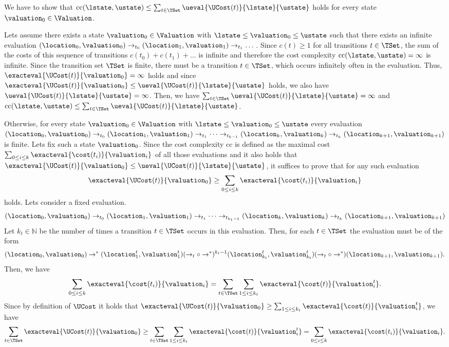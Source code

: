 We have to show that $\text{cc}(\lstate, \ustate) \leq \sum_{t \in \TSet} \ueval{\UCost(t)}{\lstate}{\ustate}$ holds for every state $\valuation_0 \in \Valuation$.

Lets assume there exists a state $\valuation_0 \in \Valuation$ with $\lstate \leq \valuation_0 \leq \ustate$ such that there exists an infinite evaluation $(\location_0, \valuation_0) \rightarrow_{t_0} (\location_1, \valuation_1) \rightarrow_{t_1} \dots$.
Since $c(t) \geq 1$ for all transitions $t \in \TSet$, the sum of the costs of this sequence of transitions $c(t_0) + c(t_1) + \dots$ is infinite and therefore the cost complexity $\text{cc}(\lstate, \ustate) = \infty$ is infinite.
Since the transition set $\TSet$ is finite, there must be a transition $t \in \TSet$, which occurs infinitely often in the evaluation.
Thus, $\exacteval{\UCost(t)}{\valuation_0} = \infty$ holds and since $\exacteval{\UCost(t)}{\valuation_0} \leq \ueval{\UCost(t)}{\lstate}{\ustate}$ holds, we also have $\ueval{\UCost(t)}{\lstate}{\ustate} = \infty$.
Then, we have $\sum_{t \in \TSet} \ueval{\UCost(t)}{\lstate}{\ustate} = \infty$ and $\text{cc}(\lstate, \ustate) \leq \sum_{t \in \TSet} \ueval{\UCost(t)}{\lstate}{\ustate}$.

Otherwise, for every state $\valuation_0 \in \Valuation$ with $\lstate \leq \valuation_0 \leq \ustate$ every evaluation $(\location_0, \valuation_0) \rightarrow_{t_0} (\location_1, \valuation_1) \rightarrow_{t_1} \dots \rightarrow_{t_{k-1}} (\location_k, \valuation_k) \rightarrow_{t_k} (\location_{k+1}, \valuation_{k+1})$ is finite.
Lets fix such a state $\valuation_0$.
Since the cost complexity $\text{cc}$ is defined as the maximal cost $\sum_{0 \leq i \leq k} \exacteval{\cost(t_i)}{\valuation_i}$ of all those evaluations and it also holds that $\exacteval{\UCost(t)}{\valuation_0} \leq \ueval{\UCost(t)}{\lstate}{\ustate}$, it suffices to prove that for any such evaluation \[ \exacteval{\UCost(t)}{\valuation_0} \geq \sum_{0 \leq i \leq k} \exacteval{\cost(t_i)}{\valuation_i} \] holds.
Lets consider a fixed evaluation.
\[ (\location_0, \valuation_0) \rightarrow_{t_0} (\location_1, \valuation_1) \rightarrow_{t_1} \dots \rightarrow_{t_{k_1-1}} (\location_k, \valuation_k) \rightarrow_{t_k} (\location_{k+1}, \valuation_{k+1}) \]
Let $k_t \in \mathbb{N}$ be the number of times a transition $t \in \TSet$ occurs in this evaluation.
Then, for each $t \in \TSet$ the evaluation must be of the form
\[ (\location_0, \valuation_0) \rightarrow^* (\location^t_1, \valuation^t_1) (\rightarrow_t \circ \rightarrow^*)^{k_t-1} (\location^t_{k_t}, \valuation^t_{k_t}) (\rightarrow_t \circ \rightarrow^*) (\location_{k+1}, \valuation_{k+1}). \]
Then, we have \[ \sum_{0 \leq i \leq k} \exacteval{\cost(t_i)}{\valuation_i} = \sum_{t \in \TSet} \sum_{1 \leq i \leq k_t} \exacteval{\cost(t)}{\valuation^t_i}. \]
Since by definition of $\UCost$ it holds that $\exacteval{\UCost(t)}{\valuation_0} \geq \sum_{1 \leq i \leq k_t} \exacteval{\cost(t)}{\valuation^t_i}$, we have \[ \sum_{t \in \TSet} \exacteval{\UCost(t)}{\valuation_0} \geq \sum_{t \in \TSet} \sum_{1 \leq i \leq k_t} \exacteval{\cost(t)}{\valuation^t_i} = \sum_{0 \leq i \leq k} \exacteval{\cost(t_i)}{\valuation_i}. \]

